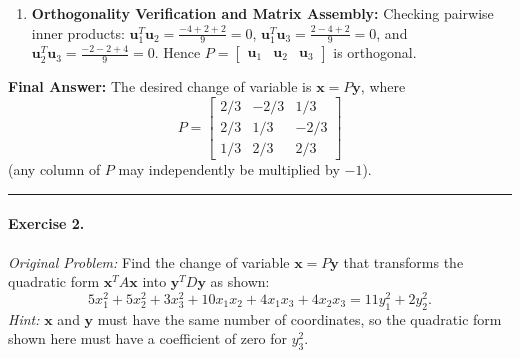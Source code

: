 \documentclass[11pt, letterpaper]{article}
\theoremstyle{definition}
\theoremstyle{remark}
\begin{document}
\begin{enumerate}[leftmargin=2em]
    \[
    \mathbf{u}_3 = \begin{bmatrix} 1/3 \\ -2/3 \\ 2/3 \end{bmatrix}.
    \]
    \item \textbf{Orthogonality Verification and Matrix Assembly:}
    Checking pairwise inner products: $\mathbf{u}_1^T \mathbf{u}_2 = \frac{-4 + 2 + 2}{9} = 0$, $\mathbf{u}_1^T \mathbf{u}_3 = \frac{2 - 4 + 2}{9} = 0$, and $\mathbf{u}_2^T \mathbf{u}_3 = \frac{-2 - 2 + 4}{9} = 0$. Hence $P = \begin{bmatrix} \mathbf{u}_1 & \mathbf{u}_2 & \mathbf{u}_3 \end{bmatrix}$ is orthogonal.
\end{enumerate}
\textbf{Final Answer:} The desired change of variable is $\mathbf{x} = P\mathbf{y}$, where
\[
P = \begin{bmatrix} 2/3 & -2/3 & 1/3 \\ 2/3 & 1/3 & -2/3 \\ 1/3 & 2/3 & 2/3 \end{bmatrix}
\]
(any column of $P$ may independently be multiplied by $-1$).

\medskip
\hrule
\medskip

\paragraph{Exercise 2.}
\emph{Original Problem:} Find the change of variable $\mathbf{x} = P\mathbf{y}$ that transforms the quadratic form $\mathbf{x}^T A \mathbf{x}$ into $\mathbf{y}^T D \mathbf{y}$ as shown:
\[
5x_1^2 + 5x_2^2 + 3x_3^2 + 10x_1 x_2 + 4x_1 x_3 + 4x_2 x_3 = 11y_1^2 + 2y_2^2.
\]
\emph{Hint:} $\mathbf{x}$ and $\mathbf{y}$ must have the same number of coordinates, so the quadratic form shown here must have a coefficient of zero for $y_3^2$.
\end{document}
